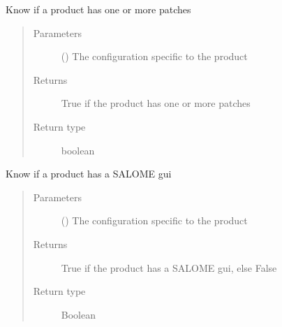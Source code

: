 \documentclass[a4paper,10pt,english]{sphinxmanual}
\begin{document}

\begin{fulllineitems}
\label{\detokenize{commands/apidoc/src:src.product.product_has_patches}}
Know if a product has one or more patches
\begin{quote}\begin{description}
\item[{Parameters}] \leavevmode
{} () \textendash{} The configuration specific to 
the product

\item[{Returns}] \leavevmode
True if the product has one or more patches

\item[{Return type}] \leavevmode
boolean

\end{description}\end{quote}

\end{fulllineitems}


\begin{fulllineitems}
\label{\detokenize{commands/apidoc/src:src.product.product_has_salome_gui}}
Know if a product has a SALOME gui
\begin{quote}\begin{description}
\item[{Parameters}] \leavevmode
{} () \textendash{} The configuration specific to 
the product

\item[{Returns}] \leavevmode
True if the product has a SALOME gui, else False

\item[{Return type}] \leavevmode
Boolean

\end{description}\end{quote}

\end{fulllineitems}
\end{document}
